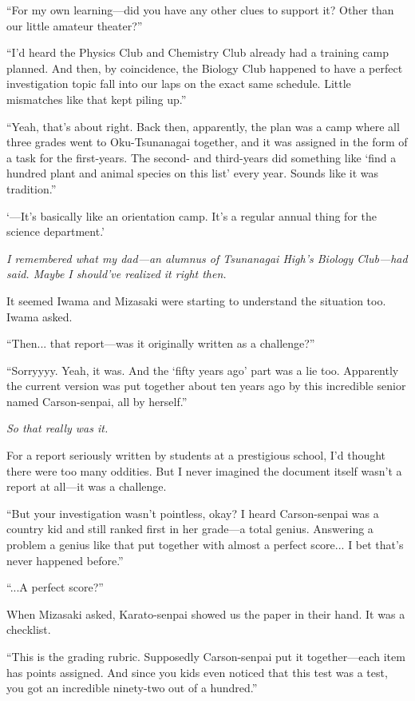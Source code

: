 \documentclass[
    a4paper,
    12pt,
    twoside,
    openany,
    UTF8,
    fontset=windows
]{ctexbook}
\begin{document}
``For my own learning---did you have any other clues to support it? Other than our little amateur theater?''

``I'd heard the Physics Club and Chemistry Club already had a training camp planned. And then, by coincidence, the Biology Club happened to have a perfect investigation topic fall into our laps on the exact same schedule. Little mismatches like that kept piling up.''

``Yeah, that's about right. Back then, apparently, the plan was a camp where all three grades went to Oku-Tsunanagai together, and it was assigned in the form of a task for the first-years. The second- and third-years did something like `find a hundred plant and animal species on this list' every year. Sounds like it was tradition.''

`---It's basically like an orientation camp. It's a regular annual thing for the science department.'

\textit{I remembered what my dad---an alumnus of Tsunanagai High's Biology Club---had said. Maybe I should've realized it right then.}

It seemed Iwama and Mizasaki were starting to understand the situation too. Iwama asked.

``Then... that report---was it originally written as a challenge?''

``Sorryyyy. Yeah, it was. And the `fifty years ago' part was a lie too. Apparently the current version was put together about ten years ago by this incredible senior named Carson-senpai, all by herself.''

\textit{So that really was it.}

For a report seriously written by students at a prestigious school, I'd thought there were too many oddities. But I never imagined the document itself wasn't a report at all---it was a challenge.

``But your investigation wasn't pointless, okay? I heard Carson-senpai was a country kid and still ranked first in her grade---a total genius. Answering a problem a genius like that put together with almost a perfect score... I bet that's never happened before.''

``...A perfect score?''

When Mizasaki asked, Karato-senpai showed us the paper in their hand. It was a checklist.

``This is the grading rubric. Supposedly Carson-senpai put it together---each item has points assigned. And since you kids even noticed that this test was a test, you got an incredible ninety-two out of a hundred.''
\end{document}
